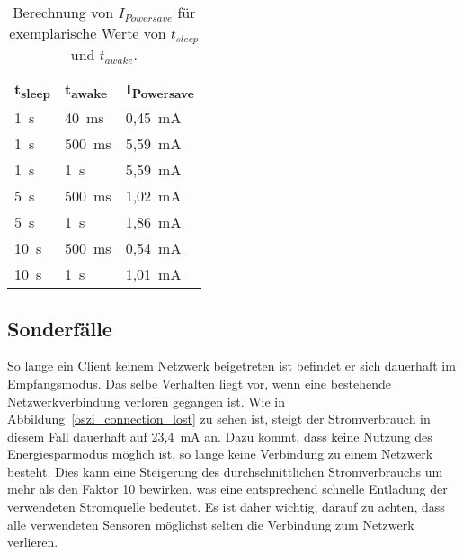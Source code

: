 \begin{table}
    \begin{center}
        \begin{tabular}{lll}
            \textbf{t\textsubscript{sleep}} & \textbf{t\textsubscript{awake}} & \textbf{I\textsubscript{Powersave}} \\
            1~s  & 40~ms  & 0,45~mA \\
            1~s  & 500~ms & 5,59~mA \\
            1~s  & 1~s    & 5,59~mA \\
            5~s  & 500~ms & 1,02~mA \\
            5~s  & 1~s    & 1,86~mA \\
            10~s & 500~ms & 0,54~mA \\
            10~s & 1~s    & 1,01~mA 
        \end{tabular}
    \end{center}
    \caption{Berechnung von $I_{Powersave}$ für exemplarische Werte von $t_{sleep}$ und $t_{awake}$.}
    \label{werte_Ipowersave}
\end{table}

\subsection{Sonderfälle}\label{leistungsaufnahme_sonderfaelle}
\Abbildungps{!htb}{0.75}{oszi/not_joined.jpg}{oszi_not_joined}{Client mit deaktiviertem Empfangsmodus.
    }
\Abbildungps{!htb}{0.75}{oszi/joined.jpg}{oszi_joined}{Beitrittsvorgang eines Clients in ein Netzwerk.
    }

So lange ein Client keinem Netzwerk beigetreten ist befindet er sich dauerhaft im Empfangsmodus. Das selbe Verhalten liegt
vor, wenn eine bestehende Netzwerkverbindung verloren gegangen ist. Wie in Abbildung~\ref{oszi_connection_lost} zu sehen
ist, steigt der Stromverbrauch in diesem Fall dauerhaft auf 23,4~mA an. Dazu kommt, dass keine Nutzung des Energiesparmodus
möglich ist, so lange keine Verbindung zu einem Netzwerk besteht. Dies kann eine Steigerung des durchschnittlichen
Stromverbrauchs um mehr als den Faktor 10 bewirken, was eine entsprechend schnelle Entladung der verwendeten Stromquelle bedeutet.
Es ist daher wichtig, darauf zu achten, dass alle verwendeten Sensoren möglichst selten die Verbindung zum 
Netzwerk verlieren.


